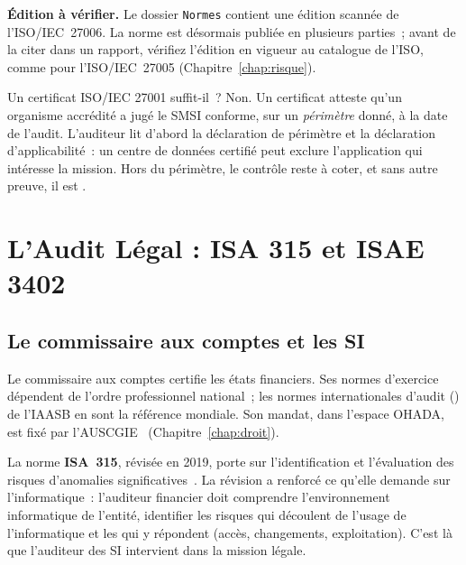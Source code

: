 \begin{boxinfo}
\textbf{Édition à vérifier.} Le dossier \texttt{Normes} contient une
édition scannée de l'ISO/IEC~27006. La norme est désormais publiée en
plusieurs parties~; avant de la citer dans un rapport, vérifiez l'édition en
vigueur au catalogue de l'ISO, comme pour l'ISO/IEC~27005
(Chapitre~\ref{chap:risque}).
\end{boxinfo}

\begin{boiteRemarque}{Un certificat ISO/IEC 27001 suffit-il~?}
Non. Un certificat atteste qu'un organisme accrédité a jugé le SMSI
conforme, sur un \emph{périmètre} donné, à la date de l'audit. L'auditeur
lit d'abord la déclaration de périmètre et la déclaration d'applicabilité~:
un centre de données certifié peut exclure l'application qui intéresse la
mission. Hors du périmètre, le contrôle reste à coter, et sans autre
preuve, il est \NEK{}.
\end{boiteRemarque}

\section{L'Audit Légal : ISA 315 et ISAE 3402}
\label{sec:c10-legal}

\subsection{Le commissaire aux comptes et les SI}

Le commissaire aux comptes certifie les états financiers. Ses normes
d'exercice dépendent de l'ordre professionnel national~; les normes
internationales d'audit () de l'IAASB en sont la référence
mondiale. Son mandat, dans l'espace OHADA, est fixé par
l'AUSCGIE~\cite{ohada2014auscgie} (Chapitre~\ref{chap:droit}).

La norme \textbf{ISA~315}, révisée en 2019, porte sur l'identification et
l'évaluation des risques d'anomalies significatives~\cite{iaasb2019isa315}.
La révision a renforcé ce qu'elle demande sur l'informatique~: l'auditeur
financier doit comprendre l'environnement informatique de l'entité,
identifier les risques qui découlent de l'usage de l'informatique et les
 qui y répondent (accès, changements, exploitation). C'est
là que l'auditeur des SI intervient dans la mission légale.

